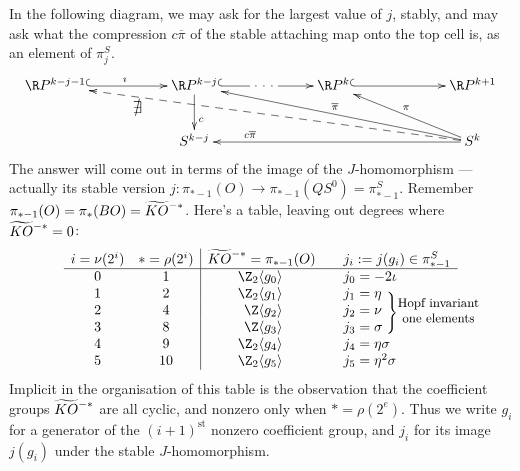 In the following diagram, we may ask for the largest value of $j$, stably, and may ask what the compression $c\overline\pi$ of the stable attaching map onto the top cell is, as an element of $\pi^S_j$.
\[\xymatrix@!0@C=3.5cm@R=1.4cm{
\RP^{k-j-1}\ar@{^{(}->}[r]^\imath &\ar[d]^(.6)c \RP^{k-j}\ar|{\ \cdot\ \cdot\ \cdot\ }@{^{(}->}[r]& \RP^k \ar@{^{(}->}[r] & \RP^{k+1}\\
&S^{k-j}&&\ar[ull]_{\overline\pi}\ar@{-->}[ulll]^(.8){\text{\large$\nexists$}}S^{k}\ar[ul]_\pi\ar[ll]_(.8){c\overline\pi}
}\]
The answer will come out in terms of the image of the $J$-homomorphism --- actually its stable version $j: \pi_{*-1}(O) \to \pi_{*-1}(QS^0) = \pi_{*-1}^S$.  Remember $\pi_{*-1}(O) = \pi_* (BO) = \widetilde{KO}\rule{0mm}{1.7ex}^{-*}$.  Here's a table, leaving out degrees where $\widetilde{KO}\rule{0mm}{1.7ex}^{-*} = 0$:
\[
\begin{array}{cc|ccl}
i=\nu(2^i) & *=\rho(2^i) & \widetilde{KO}\rule{0mm}{1.7ex}^{-*}=\pi_{*-1}(O) &&j_i:=j(g_i)\in\pi_{*-1}^S \\
\hline
0 & 1 & \makebox[1.05cm][r]{$\Z_2 \langle g_0\rangle$} && \makebox[1.4cm][l]{$j_0=-2 \iota$} \\
1 & 2 & \makebox[1.05cm][r]{$\Z_2 \langle g_1\rangle$} && \makebox[1.4cm][l]{$j_1=\eta $}\\
2 & 4 & \makebox[1.05cm][r]{$\Z \langle g_2\rangle$} && \makebox[1.4cm][l]{$j_2=\nu\ \makebox[0cm][l]{\raisebox{-.5mm}[0cm][0cm]{$\Biggr\}\raisebox{-1ex}{\text{\shortstack{\small Hopf invariant\\\small\small one elements}}}$}} $}\\
3 & 8 & \makebox[1.05cm][r]{$\Z \langle  g_3\rangle$} && \makebox[1.4cm][l]{$j_3=\sigma$} \\
4 & 9 & \makebox[1.05cm][r]{$\Z_2 \langle  g_4\rangle$} && \makebox[1.4cm][l]{$j_4=\eta \sigma$} \\
5 & 10 & \makebox[1.05cm][r]{$\Z_2 \langle  g_5\rangle$} && \makebox[1.4cm][l]{$j_5=\eta^2 \sigma$}
\end{array}
\]
Implicit in the organisation of this table is the observation that the coefficient groups $\widetilde{KO}\rule{0mm}{1.7ex}^{-*}$ are all cyclic, and nonzero only when $*=\rho(2^e)$. Thus we write $g_i$ for a generator of the $(i+1)^\text{st}$ nonzero coefficient group, and $j_i$ for its image $j(g_i)$ under the stable $J$-homomorphism.

